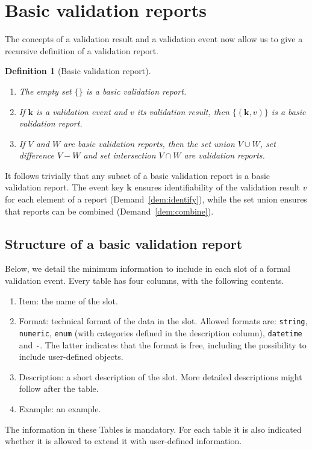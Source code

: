 \documentclass[a4paper, 11pt]{article}
\newtheorem{definition}{Definition}
\newcommand{\code}[1]{\texttt{#1}}
\newcommand{\la}[1]{\boldsymbol{#1}}
\begin{document}
\section{Basic validation reports}
The concepts of a validation result and a validation event now allow us to 
give a recursive definition of a validation report.
%
\begin{definition}[Basic validation report]\leavevmode
\begin{enumerate}[topsep=0pt,itemsep=0pt]
\item The empty set $\{\}$ is a basic validation report.
\item If $\la{k}$ is a validation event and $v$ its validation result, then $\{(\la{k},v)\}$
is a basic validation report.
\item If $V$ and $W$ are basic validation reports, then the set union $V\cup
W$, set difference $V-W$ and set intersection $V\cap W$ are validation reports.
\end{enumerate}
\end{definition}
%
It follows trivially that any subset of a basic validation report is a
basic validation report. The event key $\la{k}$ ensures identifiability of the
validation result $v$ for each element of a report (Demand~\ref{dem:identify}),
while the set union ensures that reports can be combined
(Demand~\ref{dem:combine}).


\subsection{Structure of a basic validation report}
Below, we detail the minimum information to include in each slot of a formal 
validation event. Every table has four columns, with the following contents.
\begin{enumerate}
\item Item: the name of the slot.
\item Format: technical format of the data in the slot. Allowed formats are: \code{string},
\code{numeric}, \code{enum} (with categories defined in the description column), \code{datetime} and
\code{-}. The latter indicates that the format is free, including the possibility to include user-defined objects.
\item Description: a short description of the slot. More detailed descriptions
might follow after the table.
\item Example: an example.
\end{enumerate}
%
The information in these Tables is mandatory. For each table it is also
indicated whether it is allowed to extend it with user-defined information.
\end{document}
